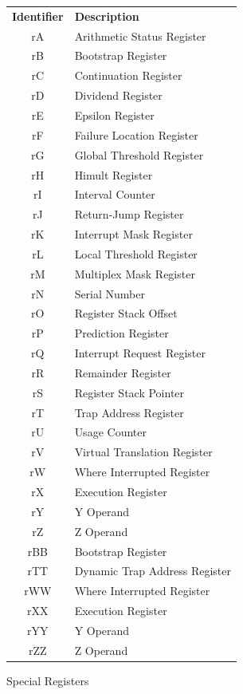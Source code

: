 \documentclass[a4paper,11pt]{report}
\newcommand{\head}[1]{\textbf{#1}}
\begin{document}
\begin{figure}[ht!]
\begin{center}
\begin{tabular}{ c l }
\head{Identifier} & \head{Description}\\
rA & Arithmetic Status Register\\
rB & Bootstrap Register\\
rC & Continuation Register\\
rD & Dividend Register\\
rE & Epsilon Register\\
rF & Failure Location Register\\
rG & Global Threshold Register\\
rH & Himult Register\\
rI & Interval Counter\\
rJ & Return-Jump Register\\
rK & Interrupt Mask Register\\
rL & Local Threshold Register\\
rM & Multiplex Mask Register\\
rN & Serial Number\\
rO & Register Stack Offset\\
rP & Prediction Register\\
rQ & Interrupt Request Register\\
rR & Remainder Register\\
rS & Register Stack Pointer\\
rT & Trap Address Register\\
rU & Usage Counter\\
rV & Virtual Translation Register\\
rW & Where Interrupted Register\\
rX & Execution Register\\
rY & Y Operand\\
rZ & Z Operand\\
rBB & Bootstrap Register\\
rTT & Dynamic Trap Address Register\\
rWW & Where Interrupted Register\\
rXX & Execution Register\\
rYY & Y Operand\\
rZZ & Z Operand\\
\end{tabular}
\end{center}
\caption{Special Registers}
\label{fig:spec_regs}
\end{figure}
\end{document}
